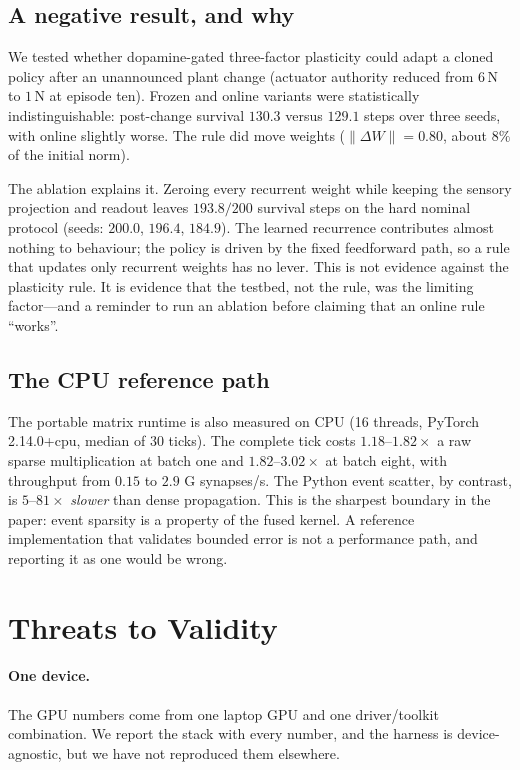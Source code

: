\documentclass[11pt]{article}
\begin{document}



\subsection{A negative result, and why}

We tested whether dopamine-gated three-factor plasticity could adapt a cloned
policy after an unannounced plant change (actuator authority reduced from $6$\,N
to $1$\,N at episode ten). Frozen and online variants were statistically
indistinguishable: post-change survival $130.3$ versus $129.1$ steps over three
seeds, with online slightly worse. The rule did move weights ($\|\Delta W\| =
0.80$, about $8\%$ of the initial norm).

The ablation explains it. Zeroing every recurrent weight while keeping the
sensory projection and readout leaves $193.8/200$ survival steps on the hard
nominal protocol (seeds: $200.0$, $196.4$, $184.9$). The learned recurrence
contributes almost nothing to behaviour; the policy is driven by the fixed
feedforward path, so a rule that updates only recurrent weights has no lever.
This is not evidence against the plasticity rule. It is evidence that the
testbed, not the rule, was the limiting factor---and a reminder to run an
ablation before claiming that an online rule ``works''.

\subsection{The CPU reference path}

The portable matrix runtime is also measured on CPU (16 threads, PyTorch
2.14.0+cpu, median of 30 ticks). The complete tick costs $1.18$--$1.82\times$ a
raw sparse multiplication at batch one and $1.82$--$3.02\times$ at batch eight,
with throughput from $0.15$ to $2.9$ G synapses/s. The Python event scatter, by
contrast, is $5$--$81\times$ \emph{slower} than dense propagation. This is the
sharpest boundary in the paper: event sparsity is a property of the fused kernel.
A reference implementation that validates bounded error is not a performance
path, and reporting it as one would be wrong.

\section{Threats to Validity}

\paragraph{One device.} The GPU numbers come from one laptop
GPU and one driver/toolkit combination. We report the stack with every number,
and the harness is device-agnostic, but we have not reproduced them elsewhere.
\end{document}
